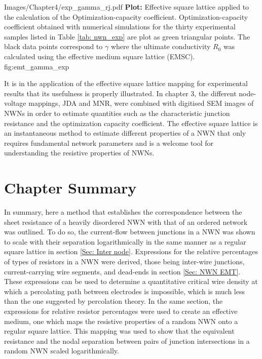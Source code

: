 {Images/Chapter4/exp_gamma_rj.pdf}
{\textbf{Plot:} Effective square lattice applied to the calculation of the Optimization-capacity coefficient.}
{Optimization-capacity coefficient obtained with numerical simulations for the thirty experimental samples listed in Table \ref{tab: nwn_exp} are plot as green triangular points. The black data points correspond to $\gamma$ where the ultimate conductivity $R_0$ was calculated using the effective medium square lattice (EMSC).} 
{fig:emt_gamma_exp}

It is in the application of the effective square lattice mapping for experimental results that its usefulness is properly illustrated. In chapter 3, the different node-voltage mappings, JDA and MNR, were combined with digitised SEM images of NWNs in order to estimate quantities such as the characteristic junction resistance and the optimization capacity coefficient. The effective square lattice is an instantaneous method to estimate different properties of a NWN that only requires fundamental network parameters and is a welcome tool for understanding the resistive properties of NWNs.

\section{Chapter Summary}
\label{Sec: EMTGF Conclusion}
In summary, here a method that establishes the correspondence between the sheet resistance of a heavily disordered NWN with that of an ordered network was outlined. To do so, the current-flow between junctions in a NWN was shown to scale with their separation logarithmically in the same manner as a regular square lattice in section \ref{Sec: Inter node}. Expressions for the relative percentages of types of resistors in a NWN were derived, those being inter-wire junctions, current-carrying wire segments, and dead-ends in section \ref{Sec: NWN EMT}. These expressions can be used to determine a quantitative critical wire density at which a percolating path between electrodes is impossible, which is much less than the one suggested by percolation theory. In the same section, the expressions for relative resistor percentages were used to create an effective medium, one which maps the resistive properties of a random NWN onto a regular square lattice. This mapping was used to show that the equivalent resistance and the nodal separation between pairs of junction intersections in a random NWN scaled logarithmically.

